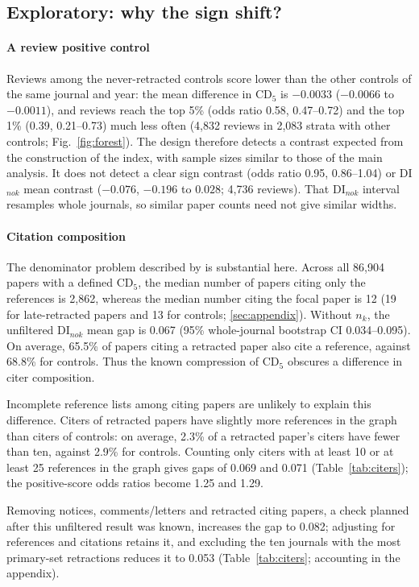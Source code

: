 \subsection{Exploratory: why the sign shift?}
\paragraph{A review positive control}
Reviews among the never-retracted controls score lower than the other controls of the same journal and year: the mean
difference in CD$_5$ is $-0.0033$ ($-0.0066$ to $-0.0011$), and reviews reach the top 5\% (odds ratio 0.58,
0.47--0.72) and the top 1\% (0.39, 0.21--0.73) much less often (4,832 reviews in 2,083 strata with other controls;
Fig.~\ref{fig:forest}). The design therefore detects a contrast expected from the construction of the index, with
sample sizes similar to those of the main analysis. It does not detect a clear sign contrast (odds ratio 0.95,
0.86--1.04) or DI$_{nok}$ mean contrast ($-0.076$, $-0.196$ to $0.028$; 4,736 reviews). That DI$_{nok}$ interval
resamples whole journals, so similar paper counts need not give similar widths.

\paragraph{Citation composition}
The denominator problem described by \citet{bornmann2020convergent} is substantial here. Across all 86,904 papers
with a defined CD$_5$, the median number of papers citing only the references is 2,862, whereas the median number
citing the focal paper is 12 (19 for late-retracted papers and 13 for controls; \ref{sec:appendix}).
Without $n_k$, the unfiltered DI$_{nok}$ mean gap is 0.067 (95\% whole-journal bootstrap CI 0.034--0.095).
On average, 65.5\% of papers citing a retracted paper also cite a reference, against 68.8\% for controls.
Thus the known compression of CD$_5$ obscures a difference in citer composition.

Incomplete reference lists among citing papers are unlikely to explain this difference. Citers of retracted papers have
slightly more references in the graph than citers of controls: on average, 2.3\% of a retracted paper's citers
have fewer than ten, against 2.9\% for controls. Counting only citers with at least 10 or at least 25 references
in the graph gives gaps of 0.069 and 0.071 (Table~\ref{tab:citers}); the positive-score odds ratios become
1.25 and 1.29.

Removing notices, comments/letters and retracted citing papers, a check planned after this unfiltered result was
known, increases the gap to 0.082; adjusting for references and citations retains it, and excluding the ten journals
with the most primary-set retractions reduces it to 0.053 (Table~\ref{tab:citers}; accounting in the appendix).

